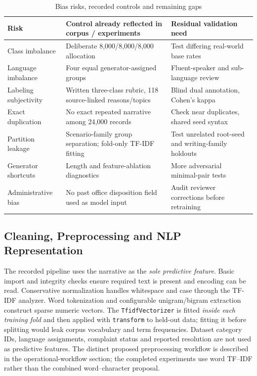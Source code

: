 \begin{table}[H]\centering\caption{Bias risks, recorded controls and remaining gaps}\label{tab:m1bias}\footnotesize
\begin{tabularx}{\textwidth}{p{}p{}X}\toprule
\textbf{Risk} & \textbf{Control already reflected in corpus / experiments} & \textbf{Residual validation need}\\\midrule
Class imbalance & Deliberate 8,000/8,000/8,000 allocation & Test differing real-world base rates\\
Language imbalance & Four equal generator-assigned groups & Fluent-speaker and sub-language review\\
Labeling subjectivity & Written three-class rubric, 118 source-linked reasons/topics & Blind dual annotation, Cohen's kappa\\
Exact duplication & No exact repeated narrative among 24,000 records & Check near duplicates, shared seed syntax\\
Partition leakage & Scenario-family group separation; fold-only TF-IDF fitting & Test unrelated root-seed and writing-family holdouts\\
Generator shortcuts & Length and feature-ablation diagnostics & More adversarial minimal-pair tests\\
Administrative bias & No past office disposition field used as model input & Audit reviewer corrections before retraining\\\bottomrule
\end{tabularx}\end{table}

\subsection{Cleaning, Preprocessing and NLP Representation}
The recorded pipeline uses the narrative as the \emph{sole predictive feature}. Basic import and integrity checks ensure required text is present and encoding can be read. Conservative normalization handles whitespace and case through the TF-IDF analyzer. Word tokenization and configurable unigram/bigram extraction construct sparse numeric vectors. The \texttt{TfidfVectorizer} is fitted \emph{inside each training fold} and then applied with \texttt{transform} to held-out data; fitting it before splitting would leak corpus vocabulary and term frequencies. Dataset category IDs, language assignments, complaint status and reported resolution are not used as predictive features. The distinct proposed preprocessing workflow is described in the operational-workflow section; the completed experiments use word TF--IDF rather than the combined word--character proposal.

